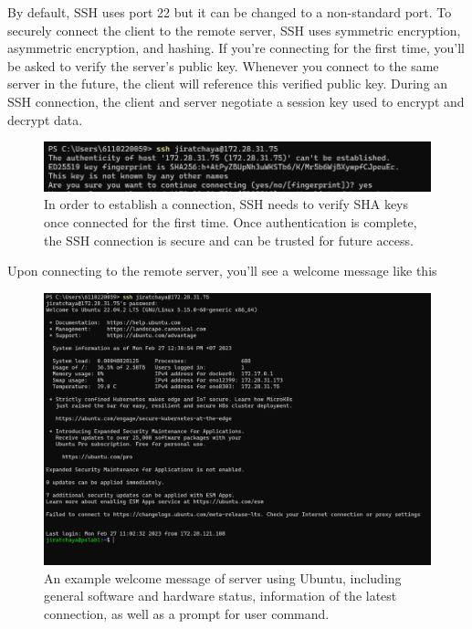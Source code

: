 \documentclass[
  letterpaper,
  DIV=11,
  numbers=noendperiod]{scrreprt}
\begin{document}
By default, SSH uses port 22 but it can be changed to a non-standard
port. To securely connect the client to the remote server, SSH uses
symmetric encryption, asymmetric encryption, and hashing. If you're
connecting for the first time, you'll be asked to verify the server's
public key. Whenever you connect to the same server in the future, the
client will reference this verified public key. During an SSH
connection, the client and server negotiate a session key used to
encrypt and decrypt data.

\begin{figure}

{\centering \includegraphics{./assets/02_ssh_authkeys.png}

}

\caption{In order to establish a connection, SSH needs to verify SHA
keys once connected for the first time. Once authentication is complete,
the SSH connection is secure and can be trusted for future access.}

\end{figure}

Upon connecting to the remote server, you'll see a welcome message like
this

\begin{figure}

{\centering \includegraphics{./assets/03_ssh-welcome-message.png}

}

\caption{An example welcome message of server using Ubuntu, including
general software and hardware status, information of the latest
connection, as well as a prompt for user command.}

\end{figure}
\end{document}
